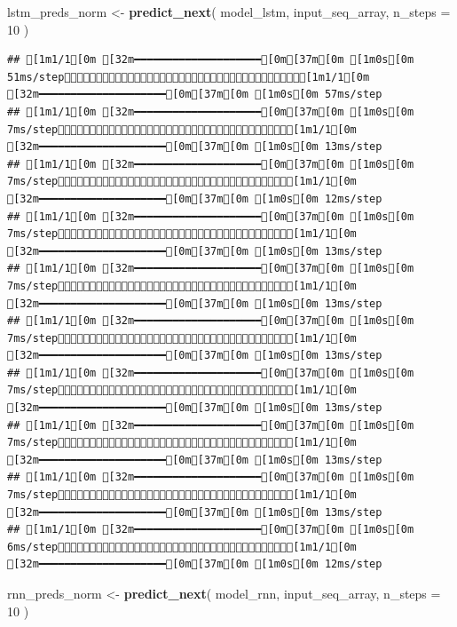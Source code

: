 \documentclass[
]{article}
\newenvironment{Shaded}{\begin{snugshade}}{\end{snugshade}}
\newcommand{\AttributeTok}[1]{\textcolor[rgb]{0.13,0.29,0.53}{#1}}
\newcommand{\DecValTok}[1]{\textcolor[rgb]{0.00,0.00,0.81}{#1}}
\newcommand{\FunctionTok}[1]{\textcolor[rgb]{0.13,0.29,0.53}{\textbf{#1}}}
\newcommand{\NormalTok}[1]{#1}
\newcommand{\OtherTok}[1]{\textcolor[rgb]{0.56,0.35,0.01}{#1}}
\begin{document}
\begin{Shaded}
\begin{Highlighting}[]
\NormalTok{lstm\_preds\_norm }\OtherTok{\textless{}{-}} \FunctionTok{predict\_next}\NormalTok{(}
\NormalTok{  model\_lstm, }
\NormalTok{  input\_seq\_array, }
  \AttributeTok{n\_steps =} \DecValTok{10}
\NormalTok{)}
\end{Highlighting}
\end{Shaded}

\begin{verbatim}
## [1m1/1[0m [32m━━━━━━━━━━━━━━━━━━━━[0m[37m[0m [1m0s[0m 51ms/step[1m1/1[0m [32m━━━━━━━━━━━━━━━━━━━━[0m[37m[0m [1m0s[0m 57ms/step
## [1m1/1[0m [32m━━━━━━━━━━━━━━━━━━━━[0m[37m[0m [1m0s[0m 7ms/step[1m1/1[0m [32m━━━━━━━━━━━━━━━━━━━━[0m[37m[0m [1m0s[0m 13ms/step
## [1m1/1[0m [32m━━━━━━━━━━━━━━━━━━━━[0m[37m[0m [1m0s[0m 7ms/step[1m1/1[0m [32m━━━━━━━━━━━━━━━━━━━━[0m[37m[0m [1m0s[0m 12ms/step
## [1m1/1[0m [32m━━━━━━━━━━━━━━━━━━━━[0m[37m[0m [1m0s[0m 7ms/step[1m1/1[0m [32m━━━━━━━━━━━━━━━━━━━━[0m[37m[0m [1m0s[0m 13ms/step
## [1m1/1[0m [32m━━━━━━━━━━━━━━━━━━━━[0m[37m[0m [1m0s[0m 7ms/step[1m1/1[0m [32m━━━━━━━━━━━━━━━━━━━━[0m[37m[0m [1m0s[0m 13ms/step
## [1m1/1[0m [32m━━━━━━━━━━━━━━━━━━━━[0m[37m[0m [1m0s[0m 7ms/step[1m1/1[0m [32m━━━━━━━━━━━━━━━━━━━━[0m[37m[0m [1m0s[0m 13ms/step
## [1m1/1[0m [32m━━━━━━━━━━━━━━━━━━━━[0m[37m[0m [1m0s[0m 7ms/step[1m1/1[0m [32m━━━━━━━━━━━━━━━━━━━━[0m[37m[0m [1m0s[0m 13ms/step
## [1m1/1[0m [32m━━━━━━━━━━━━━━━━━━━━[0m[37m[0m [1m0s[0m 7ms/step[1m1/1[0m [32m━━━━━━━━━━━━━━━━━━━━[0m[37m[0m [1m0s[0m 13ms/step
## [1m1/1[0m [32m━━━━━━━━━━━━━━━━━━━━[0m[37m[0m [1m0s[0m 7ms/step[1m1/1[0m [32m━━━━━━━━━━━━━━━━━━━━[0m[37m[0m [1m0s[0m 13ms/step
## [1m1/1[0m [32m━━━━━━━━━━━━━━━━━━━━[0m[37m[0m [1m0s[0m 6ms/step[1m1/1[0m [32m━━━━━━━━━━━━━━━━━━━━[0m[37m[0m [1m0s[0m 12ms/step
\end{verbatim}

\begin{Shaded}
\begin{Highlighting}[]
\NormalTok{rnn\_preds\_norm }\OtherTok{\textless{}{-}} \FunctionTok{predict\_next}\NormalTok{(}
\NormalTok{  model\_rnn, }
\NormalTok{  input\_seq\_array, }
  \AttributeTok{n\_steps =} \DecValTok{10}
\NormalTok{)}
\end{Highlighting}
\end{Shaded}
\end{document}
